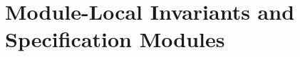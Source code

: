 \chapter{\;\;\;\;Module-Local Invariants and Specification Modules}
\label{sec:overview-modulelocal}

%
%




